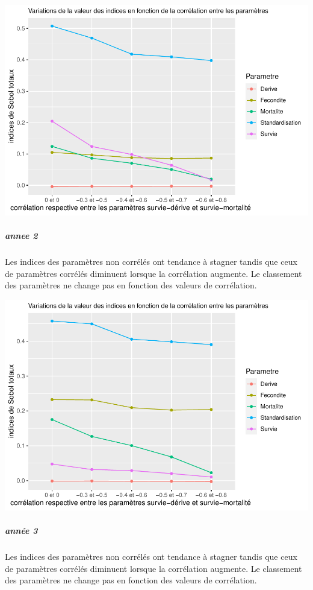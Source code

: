 \documentclass[
]{article}
\begin{document}
\includegraphics{rapport_files/figure-latex/prztygsbte-1.pdf}

\hypertarget{annee-2-3}{%
\subparagraph{annee 2}\label{annee-2-3}}

Les indices des paramètres non corrélés ont tendance à stagner tandis
que ceux de paramètres corrélés diminuent lorsque la corrélation
augmente. Le classement des paramètres ne change pas en fonction des
valeurs de corrélation.

\includegraphics{rapport_files/figure-latex/pzrtygsbte-1.pdf}

\hypertarget{annuxe9e-3-2}{%
\subparagraph{année 3}\label{annuxe9e-3-2}}

Les indices des paramètres non corrélés ont tendance à stagner tandis
que ceux de paramètres corrélés diminuent lorsque la corrélation
augmente. Le classement des paramètres ne change pas en fonction des
valeurs de corrélation.
\end{document}
